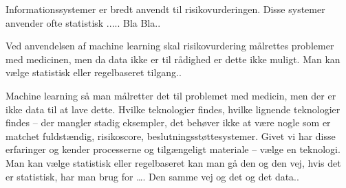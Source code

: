 Informationssystemer er bredt anvendt til risikovurderingen\citep{}. Disse systemer anvender ofte statistisk 
..... Bla Bla.. 




Ved anvendelsen af machine learning skal risikovurdering målrettes problemer med medicinen, men da data ikke er til rådighed er dette ikke muligt. Man kan vælge statistisk eller regelbaseret tilgang..


Machine learning så man målretter det til problemet med medicin, men der er ikke data til at lave dette. Hvilke teknologier findes, hvilke lignende teknologier findes – der mangler stadig eksempler, det behøver ikke at være nogle som er matchet fuldstændig, risikoscore, beslutningsstøttesystemer. Givet vi har disse erfaringer og kender processerne og tilgængeligt materiale – vælge en teknologi.
Man kan vælge statistisk eller regelbaseret kan man gå den og den vej, hvis det er statistisk, har man brug for …. Den samme vej og det og det data..




